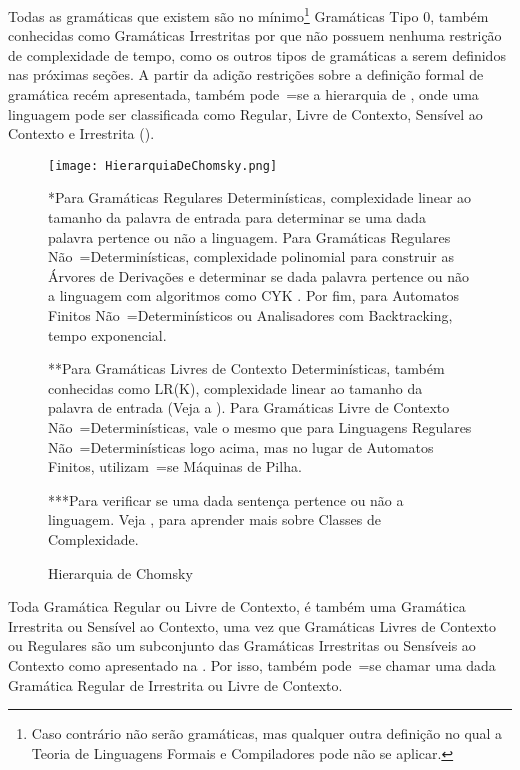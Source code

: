 Todas as gramáticas que existem são no mínimo\footnote{
Caso contrário não serão gramáticas,
mas qualquer outra definição no qual a Teoria de Linguagens Formais e
Compiladores pode não se aplicar.
}
Gramáticas Tipo 0,
também conhecidas como Gramáticas Irrestritas por que não possuem nenhuma restrição de complexidade de tempo,
como os outros tipos de gramáticas a serem definidos nas próximas seções{}.
A partir da adição restrições sobre a definição formal de gramática recém apresentada,
também pode~=se  a hierarquia de ,
onde uma linguagem pode ser classificada como Regular,
Livre de Contexto,
Sensível ao Contexto e
Irrestrita ().
\begin{figure}[!htb]
\caption{Hierarquia de Chomsky}
\label{FigureHierarquiaDeChomsky}
\centering
\texttt{[image: HierarquiaDeChomsky.png]}
\begin{minipage}{\textwidth} \footnotesize
*Para Gramáticas Regulares Determinísticas,
complexidade linear ao tamanho da palavra de entrada para determinar se uma dada palavra pertence ou
não a linguagem.
Para Gramáticas Regulares Não~=Determinísticas,
complexidade polinomial para construir as Árvores de Derivações e
determinar se dada palavra pertence ou
não a linguagem com algoritmos como CYK \cite{hopcroftBook,cykParsingAlgorithm}.
Por fim,
para Automatos Finitos Não~=Determinísticos ou
Analisadores com Backtracking,
tempo exponencial.

**Para Gramáticas Livres de Contexto Determinísticas,
também conhecidas como LR(K),
complexidade linear ao tamanho da palavra de entrada (Veja a ).
Para Gramáticas Livre de Contexto Não~=Determinísticas,
vale o mesmo que para Linguagens Regulares Não~=Determinísticas logo acima,
mas no lugar de Automatos Finitos,
utilizam~=se Máquinas de Pilha.

***Para verificar se uma dada sentença pertence ou
não a linguagem.
Veja ,
para aprender mais sobre Classes de Complexidade.
\end{minipage}
\end{figure}

Toda Gramática Regular ou
Livre de Contexto,
é também uma Gramática Irrestrita ou
Sensível ao Contexto,
uma vez que Gramáticas Livres de Contexto ou
Regulares são um subconjunto das Gramáticas Irrestritas ou
Sensíveis ao Contexto como apresentado na .
Por isso,
também pode~=se chamar uma dada Gramática Regular de Irrestrita ou
Livre de Contexto.

